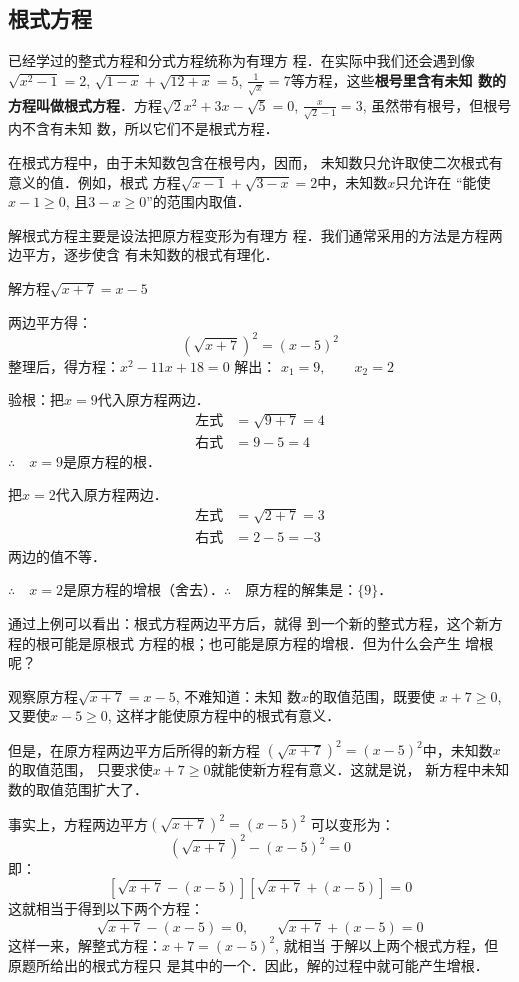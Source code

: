 \subsection{根式方程}
已经学过的整式方程和分式方程统称为有理方
程．在实际中我们还会遇到像$\sqrt{x^2-1}=2$, $\sqrt{1-x}+\sqrt{12+x}=5$,
$\frac{1}{\sqrt{x}}=7$等方程，这些\textbf{根号里含有未知
数的方程叫做根式方程}．方程$\sqrt{2}x^2+3x-\sqrt{5}=0$, 
$\frac{x}{\sqrt{2}-1}=3$, 虽然带有根号，但根号内不含有未知
数，所以它们不是根式方程．

在根式方程中，由于未知数包含在根号内，因而，
未知数只允许取使二次根式有意义的值．例如，根式
方程$\sqrt{x-1}+\sqrt{3-x}=2$中，未知数$x$只允许在
“能使$x-1\ge 0$, 且$3-x\ge 0$”的范围内取值．

解根式方程主要是设法把原方程变形为有理方
程．我们通常采用的方法是方程两边平方，逐步使含
有未知数的根式有理化．





\begin{example}\label{zengen}
解方程$\sqrt{x+7}=x-5$
\end{example}

\begin{solution}
    两边平方得：
    \[(\sqrt{x+7})^2=(x-5)^2\]
    整理后，得方程：$x^2-11x+18=0$
    解出：
    $x_1=9,\qquad x_2=2$

    验根：把$x=9$代入原方程两边．
    \[\begin{split}
        \text{左式}&=\sqrt{9+7}=4\\
        \text{右式}&=9-5=4      
    \end{split}\]
$\therefore\quad x=9$是原方程的根．
    
把$x=2$代入原方程两边．
\[\begin{split}
    \text{左式}&=\sqrt{2+7}=3\\
    \text{右式}&=2-5=-3      
\end{split}\]
两边的值不等．

$\therefore\quad x=2$是原方程的增根（舍去）．\qquad$\therefore\quad $原方程的解集是：$\{9\}$．

通过上例可以看出：根式方程两边平方后，就得
到一个新的整式方程，这个新方程的根可能是原根式
方程的根；也可能是原方程的增根．但为什么会产生
增根呢？

观察原方程$\sqrt{x+7}=x-5$, 不难知道：未知
数$x$的取值范围，既要使
$x+7\ge 0$, 又要使$x-5
\ge 0$, 这样才能使原方程中的根式有意义．

但是，在原方程两边平方后所得的新方程
$(\sqrt{x+7})^2=(x-5)^2$中，未知数$x$的取值范围，
只要求使$x+7\ge 0$就能使新方程有意义．这就是说，
新方程中未知数的取值范围扩大了．

事实上，方程两边平方$(\sqrt{x+7})^2=(x-5)^2$
可以变形为：
\[(\sqrt{x+7})^2-(x-5)^2=0\]
即：
\[\left[\sqrt{x+7}-(x-5)\right]\left[\sqrt{x+7}+(x-5)\right]=0 \]
这就相当于得到以下两个方程：
\[\sqrt{x+7}-(x-5)=0,\qquad \sqrt{x+7}+(x-5)=0\]
这样一来，解整式方程：$x+7=(x-5)^2$, 就相当
于解以上两个根式方程，但原题所给出的根式方程只
是其中的一个．因此，解的过程中就可能产生增根．
\end{solution}

